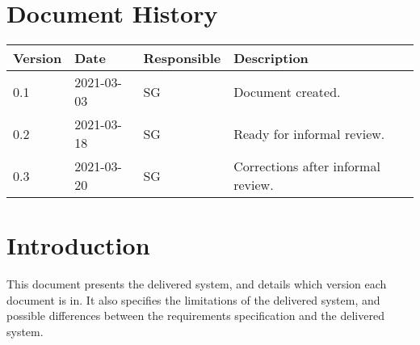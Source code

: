 \documentclass{article}
\date {#1}
\title {
    \documentNumber {01}    
    
    \documentVersion {0.3}
    
    \documentTitle {Template}
    \documentGroup {2}
    
    \documentResponsible {System Group}
    \documentAuthors {System Group}
    
    \documentDate {2021-03-20}
}
\begin{document}
\maketitle
\thispagestyle{empty}

\newpage

\tableofcontents

\newpage



\section{Document History}

\begin{tabular}{ l | l | l | l }
    Version & Date & Responsible & Description \\
    \hline
    0.1 & 2021-03-03 & SG & Document created. \\
    \hline
    0.2 & 2021-03-18 & SG & Ready for informal review. \\
    \hline
    0.3 & 2021-03-20 & SG & Corrections after informal review.
   
\end{tabular}

\section{Introduction}
    This document presents the delivered system, and details which version each document is in. It also specifies the limitations of the delivered system, and possible differences between the requirements specification and the delivered system.
\end{document}
